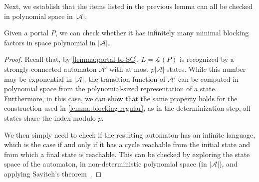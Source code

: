 \documentclass[letterpaper, USenglish, cleveref, autoref, thm-restate, numberwithinsect]{lipics-v2021}
\theoremstyle{theorem}
\theoremstyle{definition}
\newcommand{\Aa}{\mathcal{A}}
\newcommand{\lang}[1]{\mathcal{L}(#1)}
\begin{document}
Next, we establish that the items listed in the previous lemma can all be checked in polynomial space in $|\Aa|$.

\begin{lemma}
	\label{lem:aut-block-fact}
	Given a portal $P$, we can check whether it has infinitely many minimal blocking factors in space polynomial in $|\Aa|$.
\end{lemma}

\begin{proof}
	Recall that, by \cref{lemma:portal-to-SC}, $L = \lang{P}$ is recognized by a strongly connected automaton $\Aa'$ with at most $p|\Aa|$ states. While this number may be exponential in $|\Aa|$, the transition function of $\Aa'$ can be computed in polynomial space from the polynomial-sized representation of a state.
	Furthermore, in this case, we can show that the same property holds for the construction used in \cref{lemma:blocking-regular}, as in the determinization step, all states share the index modulo $p$.
	
	We then simply need to check if the resulting automaton has an infinite language, which is the case if and only if it has a cycle reachable from the initial state and from which a final state is reachable.
	This can be checked by exploring the state space of the automaton, in non-deterministic polynomial space (in $|\Aa|$), and applying Savitch's theorem~\cite[Theorem 1]{SAVITCH1970177}.  
\end{proof}
\end{document}
